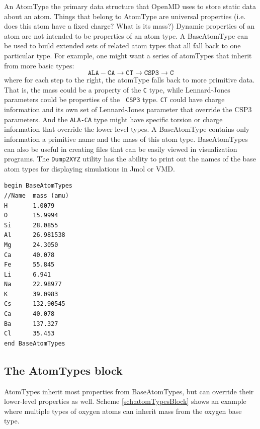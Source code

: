 \documentclass[]{book}
\begin{document}
An AtomType the primary data structure that OpenMD uses to store
static data about an atom.  Things that belong to AtomType are
universal properties (i.e. does this atom have a fixed charge?  What
is its mass?)  Dynamic properties of an atom are not intended to be
properties of an atom type.  A BaseAtomType can be used to build
extended sets of related atom types that all fall back to one
particular type.  For example, one might want a series of atomTypes
that inherit from more basic types:
\begin{displaymath}
\mathtt{ALA-CA} \rightarrow \mathtt{CT} \rightarrow \mathtt{CSP3} \rightarrow \mathtt{C}
\end{displaymath}
where for each step to the right, the atomType falls back to more
primitive data.  That is, the mass could be a property of the {\tt C}
type, while Lennard-Jones parameters could be properties of the {\tt
  CSP3} type.  {\tt CT} could have charge information and its own set
of Lennard-Jones parameter that override the CSP3 parameters.  And the
{\tt ALA-CA} type might have specific torsion or charge information
that override the lower level types.  A BaseAtomType contains only
information a primitive name and the mass of this atom type.
BaseAtomTypes can also be useful in creating files that can be easily
viewed in visualization programs.  The {\tt Dump2XYZ} utility has the
ability to print out the names of the base atom types for displaying
simulations in Jmol or VMD.

\begin{lstlisting}[caption={[A simple example of a BaseAtomTypes
block.] A simple example of a BaseAtomTypes block.},
label={sch:baseAtomTypesBlock}] 
begin BaseAtomTypes
//Name  mass (amu)
H       1.0079
O       15.9994
Si      28.0855
Al      26.981538
Mg      24.3050
Ca      40.078
Fe      55.845
Li      6.941
Na      22.98977
K       39.0983
Cs      132.90545
Ca      40.078
Ba      137.327
Cl      35.453
end BaseAtomTypes
\end{lstlisting}

\subsection{\label{section:ffAtom}The AtomTypes block}

AtomTypes inherit most properties from BaseAtomTypes, but can override
their lower-level properties as well.  Scheme \ref{sch:atomTypesBlock}
shows an example where multiple types of oxygen atoms can inherit mass
from the oxygen base type.
\end{document}
